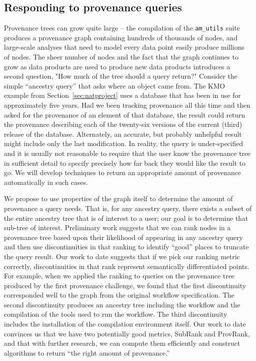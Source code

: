 \documentclass[10pt]{article}
\begin{document}
\subsection{Responding to provenance queries}
\label{sec:query}

Provenance trees can grow quite large -- the compilation of the
\texttt{am\_utils}
suite produces a provenance graph containing hundreds of thousands of nodes,
and large-scale analyses that need to model every data point easily produce
millions of nodes.
The sheer number of nodes and the fact that the graph continues to grow as
data products are used to produce new data products
introduces a second question, "How much of the tree should a query
return?"  Consider the simple ``ancestry query'' that asks where an
object came from.
The KMO example from Section~\ref{sec:natproject} 
uses a database that has been in use for approximately five years.
Had we been tracking provenance all this time and then asked for
the provenance of an element of that database, the result could
return the provenance describing each of the twenty-six versions
of the current (third) release of the database.
Alternately, an accurate, but
probably unhelpful result might include only the last modification.
In reality, the query is under-specified and it is usually not reasonable to
require that the user know the provenance tree in sufficient detail to
specify precisely how far back they would like the result to go.
We will develop techniques to return an appropriate amount of provenance
automatically in such cases.

We propose to use properties of the graph itself to determine the 
amount of provenance a query needs.
That is, for any ancestry query, there exists a subset of the entire
ancestry tree that is of interest to a user; our goal is to determine
that sub-tree of interest.
Preliminary work suggests that we can rank nodes in a provenance tree
based upon their likelihood of appearing in any ancestry query and then
use discontinuities in that ranking to identify ``good'' places to
truncate the query result.
Our work to date suggests that if we pick our ranking metric correctly,
discontinuities in that rank represent semantically differentiated points.
For example, when we applied the ranking to queries on the provenance
tree produced by the first provenance challenge, we found that the
first discontinuity corresponded well to the graph from the
original workflow specification.
The second discontinuity produces an ancestry tree including the
workflow and the compilation of the tools used to run the workflow.
The third discontinuity includes the installation of the compilation
environment itself.
Our work to date convinces us that we have two potentially good metrics,
SubRank and ProvRank,
and that with further research, we can compute them efficiently and
construct algorithms to return ``the right amount of provenance.''
\end{document}

